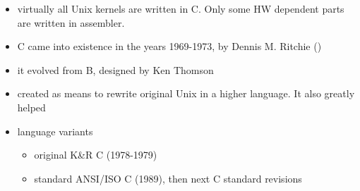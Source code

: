 \begin{slide}
\begin{itemize}
\item virtually all Unix kernels are written in C. Only some HW dependent parts
are written in assembler.
\item C came into existence in the years 1969-1973, by Dennis M. Ritchie ()
\item it evolved from B, designed by Ken Thomson
\item created as means to rewrite original Unix in a higher language.  It also
greatly helped 
\item language variants
    \begin{itemize}
    \item original K\&R C (1978-1979)
    \item standard ANSI/ISO C (1989), then next C standard revisions
    \end{itemize}
\end{itemize}
\end{slide}

